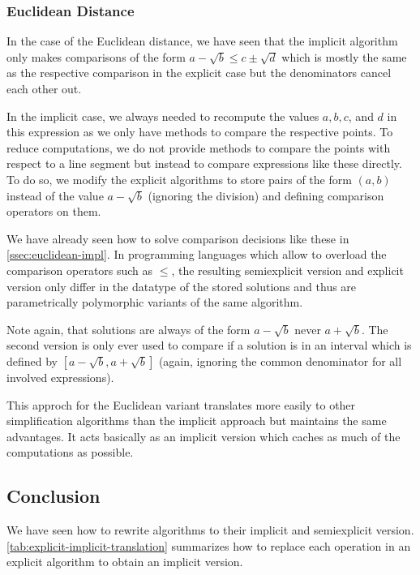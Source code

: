 \subsubsection{Euclidean Distance}

In the case of the Euclidean distance, we have seen that the implicit algorithm only makes comparisons of the form \(a - \sqrt{b} \leq c \pm \sqrt{d}\) which is mostly the same as the respective comparison in the explicit case but the denominators cancel each other out. 

In the implicit case, we always needed to recompute the values \(a, b, c\), and \(d\) in this expression as we only have methods to compare the respective points. To reduce computations, we do not provide methods to compare the points with respect to a line segment but instead to compare expressions like these directly. To do so, we modify the explicit algorithms to store pairs of the form \((a, b)\) instead of the value \(a - \sqrt{b}\) (ignoring the division) and defining comparison operators on them. 

We have already seen how to solve comparison decisions like these in \cref{ssec:euclidean-impl}. In programming languages which allow to overload the comparison operators such as \(\leq\), the resulting semiexplicit version and explicit version only differ in the datatype of the stored solutions and thus are parametrically polymorphic variants of the same algorithm. 

Note again, that solutions are always of the form \(a - \sqrt{b}\) never \(a + \sqrt{b}\). The second version is only ever used to compare if a solution is in an interval which is defined by \([a - \sqrt{b}, a + \sqrt{b}]\) (again, ignoring the common denominator for all involved expressions).

This approch for the Euclidean variant translates more easily to other simplification algorithms than the implicit approach but maintains the same advantages. It acts basically as an implicit version which caches as much of the computations as possible.

\subsection{Conclusion}
We have seen how to rewrite algorithms to their implicit and semiexplicit version. \cref{tab:explicit-implicit-translation} summarizes how to replace each operation in an explicit algorithm to obtain an implicit version.

